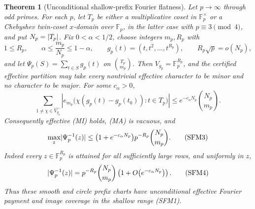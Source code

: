 \documentclass[11pt,a4paper]{amsart}
\numberwithin{equation}{section}
\newtheorem{theorem}{Theorem}[section]
\theoremstyle{remark}
\newcommand{\F}{\mathbb F}\newcommand{\B}{\mathbb B}\newcommand{\K}{\mathbb K}\newcommand{\Z}{\mathbb Z}
\begin{document}
\begin{theorem}[Unconditional shallow-prefix Fourier flatness]
\label{thm:unconditional-shallow-mi-ma}
Let \(p\to\infty\) through odd primes.  For each \(p\), let \(T_p\) be
either a multiplicative coset in \(\F_p^\times\) or a Chebyshev
twin-coset \(x\)-domain over \(\F_p\), in the latter case with
\(p\equiv3\pmod4\), and put \(N_p=\lvert T_p\rvert\).
Fix \(0<\alpha<1/2\), choose integers \(m_p,R_p\) with
\[
 1\le R_p,\qquad
 \alpha\le \frac{m_p}{N_p}\le1-\alpha,
 \qquad g_p(t)=(t,t^2,\ldots,t^{R_p}),
 \qquad R_p\sqrt p=o(N_p),                         \tag{SFM1}
\]
and let \(\Psi_p(S)=\sum_{t\in S}g_p(t)\) on
\(\binom{T_p}{m_p}\).  Then \(V_{g_p}=\F_p^{R_p}\), and the certified effective partition may take
every nontrivial effective character to be minor and no character to be
major.  For some \(c_\alpha>0\),
\[
 \sum_{1\ne\chi\in\widehat{V_{g_p}}}
 \left|e_{m_p}\bigl(\chi(g_p(t)-g_p(t_0)):t\in T_p\bigr)\right|
 \le e^{-c_\alpha N_p}\binom{N_p}{m_p}.            \tag{SFM2}
\]
Consequently effective \textup{(MI)} holds, \textup{(MA)} is vacuous,
and
\[
 \max_z\lvert \Psi_p^{-1}(z)\rvert
 \le\bigl(1+e^{-c_\alpha N_p}\bigr)
       p^{-R_p}\binom{N_p}{m_p}.                   \tag{SFM3}
\]
Indeed every \(z\in\F_p^{R_p}\) is attained for all sufficiently large
rows, and uniformly in \(z\),
\[
 \lvert \Psi_p^{-1}(z)\rvert
 =p^{-R_p}\binom{N_p}{m_p}
  \left(1+O\bigl(e^{-c_\alpha N_p}\bigr)\right).   \tag{SFM4}
\]
Thus these smooth and circle prefix charts have unconditional effective
Fourier payment and image coverage in the shallow range \textup{(SFM1)}.
\end{theorem}
\end{document}
